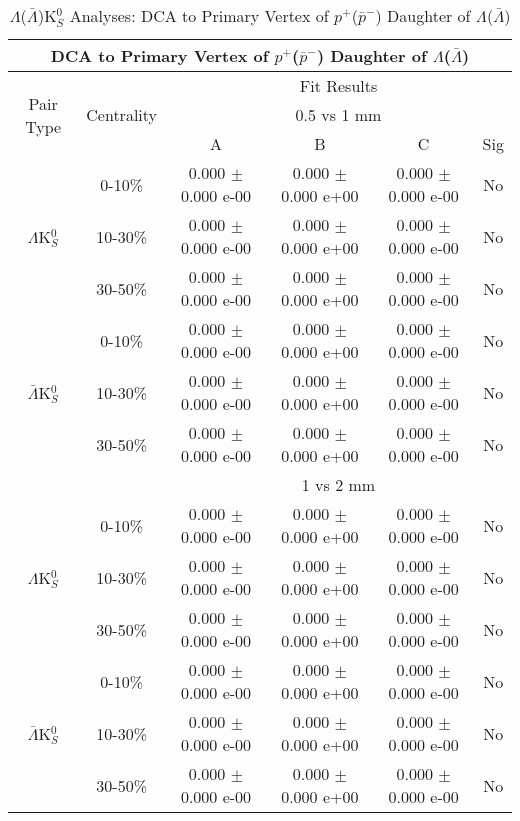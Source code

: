 \documentclass[../AnalysisNoteJBuxton.tex]{subfiles}
\begin{document}
\begin{table}
 \centering
 \begin{tabular}{|c|c|c|c|c|c|}
  \multicolumn{6}{c}{DCA to Primary Vertex of $p^{+}$($\bar{p}^{-}$) Daughter of $\Lambda$($\bar{\Lambda}$)} \\
  \hline
  \multirow{3}{*}{Pair Type} & \multirow{3}{*}{Centrality} & \multicolumn{4}{c|}{Fit Results} \\
  \cline{3-6}
   & & \multicolumn{4}{c|}{0.5 vs 1 mm} \\
  \cline{3-6}
   & & A & B & C & Sig \\
  \hline  
  \multirow{3}{*}{$\Lambda$K$^{0}_{S}$}
   &  0-10\% & 0.000 $\pm$ 0.000 e-00 & 0.000 $\pm$ 0.000 e+00 & 0.000 $\pm$ 0.000 e-00 & No \\
   & 10-30\% & 0.000 $\pm$ 0.000 e-00 & 0.000 $\pm$ 0.000 e+00 & 0.000 $\pm$ 0.000 e-00 & No \\
   & 30-50\% & 0.000 $\pm$ 0.000 e-00 & 0.000 $\pm$ 0.000 e+00 & 0.000 $\pm$ 0.000 e-00 & No \\
  \hline
  \multirow{3}{*}{$\bar{\Lambda}$K$^{0}_{S}$}  
   &  0-10\% & 0.000 $\pm$ 0.000 e-00 & 0.000 $\pm$ 0.000 e+00 & 0.000 $\pm$ 0.000 e-00 & No \\
   & 10-30\% & 0.000 $\pm$ 0.000 e-00 & 0.000 $\pm$ 0.000 e+00 & 0.000 $\pm$ 0.000 e-00 & No \\
   & 30-50\% & 0.000 $\pm$ 0.000 e-00 & 0.000 $\pm$ 0.000 e+00 & 0.000 $\pm$ 0.000 e-00 & No \\
  \hline 
  \multicolumn{2}{|c|}{} & \multicolumn{4}{c|}{1 vs 2 mm} \\
  \hline  
  \multirow{3}{*}{$\Lambda$K$^{0}_{S}$}   
   &  0-10\% & 0.000 $\pm$ 0.000 e-00 & 0.000 $\pm$ 0.000 e+00 & 0.000 $\pm$ 0.000 e-00 & No \\
   & 10-30\% & 0.000 $\pm$ 0.000 e-00 & 0.000 $\pm$ 0.000 e+00 & 0.000 $\pm$ 0.000 e-00 & No \\
   & 30-50\% & 0.000 $\pm$ 0.000 e-00 & 0.000 $\pm$ 0.000 e+00 & 0.000 $\pm$ 0.000 e-00 & No \\
  \hline  
  \multirow{3}{*}{$\bar{\Lambda}$K$^{0}_{S}$}
   &  0-10\% & 0.000 $\pm$ 0.000 e-00 & 0.000 $\pm$ 0.000 e+00 & 0.000 $\pm$ 0.000 e-00 & No \\
   & 10-30\% & 0.000 $\pm$ 0.000 e-00 & 0.000 $\pm$ 0.000 e+00 & 0.000 $\pm$ 0.000 e-00 & No \\
   & 30-50\% & 0.000 $\pm$ 0.000 e-00 & 0.000 $\pm$ 0.000 e+00 & 0.000 $\pm$ 0.000 e-00 & No \\
  \hline
 \end{tabular}
 \caption{$\Lambda$($\bar{\Lambda}$)K$^{0}_{S}$ Analyses: DCA to Primary Vertex of $p^{+}$($\bar{p}^{-}$) Daughter of $\Lambda$($\bar{\Lambda}$)}
 \label{tab:DcaToPrimVertexProtonDaughtOfLamLamK0Full}
\end{table}
\end{document}
